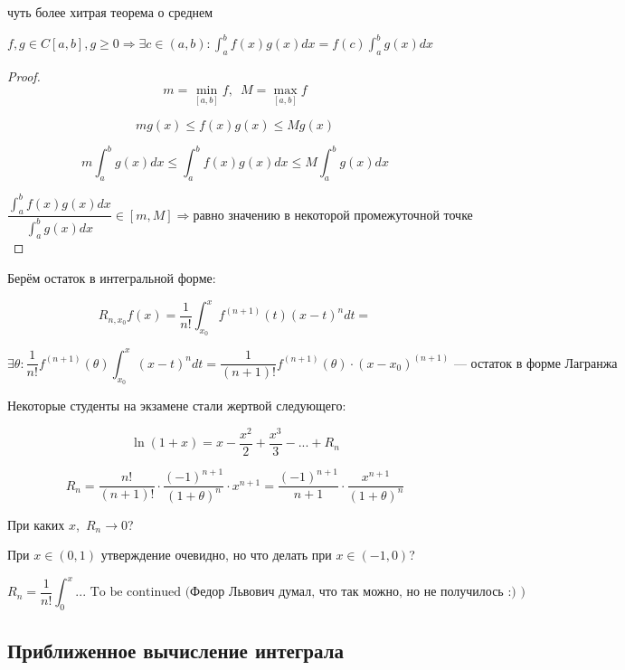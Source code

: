 \begin{namedlemma}{чуть более хитрая теорема о среднем}
    
    $f, g \in C[a, b], g \geqslant 0 \Rightarrow \exists c \in (a, b) : \int_a^b f(x) g(x) dx = f(c) \int_a^b g(x) dx$
\end{namedlemma}

\newpage 
\begin{proof}
    \[
        m = \min_{[a, b]} f, \,\,\, M = \max_{[a, b]} f
    \]

    \[
        m g(x) \leqslant f(x) g(x) \leqslant M g(x)
    \]

    \[
        m \int_a^b g(x) dx \leqslant \int_a^b f(x) g(x) dx \leqslant M \int_a^b g(x) dx
    \]

    \[
        \frac{\int_a^b f(x) g(x) dx}{\int_a^b g(x) dx} \in [m, M] \Rightarrow \text{равно значению в некоторой промежуточной точке}
    \] 
\end{proof}


Берём остаток в интегральной форме:

\[
    R_{n, x_0} f(x) = \frac{1}{n!} \int_{x_0}^x f^{(n + 1)}(t) (x - t) ^ n dt = 
\]

\[
    \exists \theta : \frac{1}{n!} f^{(n + 1)} (\theta) \int_{x_0}^x (x - t) ^ n dt = \frac{1}{(n + 1)!} f^{(n + 1)}(\theta) \cdot (x - x_0) ^ {(n + 1)} \text{ --- остаток в форме Лагранжа}
\]

\quad

Некоторые студенты на экзамене стали жертвой следующего:

\[
    \ln{(1+x)} = x - \frac{x ^ 2}{2} + \frac{x ^ 3}{3} - ... + R_n
\]

\[
    R_n = \frac{n!}{(n + 1)!} \cdot \frac{(-1) ^ {n + 1}}{(1 + \theta) ^ n} \cdot x^{n + 1} = \frac{(-1) ^ {n + 1}}{n + 1} \cdot \frac{x ^ {n + 1}}{(1 + \theta) ^ n}
\]

\quad 

При каких $x$,\, $R_n \to 0$?

При $x \in (0, 1)$ утверждение очевидно, но что делать при $x \in (-1, 0)$?

\[
    R_n = \frac{1}{n!} \int_0^x ... \text{ To be continued (Федор Львович думал, что так можно, но не получилось :) )}
\]

\newpage 

\subsection{Приближенное вычисление интеграла}

